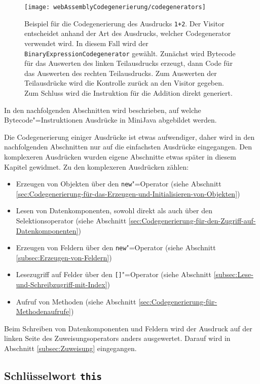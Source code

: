 \begin{figure}
    \centering
    \texttt{[image: webAssemblyCodegenerierung/codegenerators]}
    \caption{Beispiel für die Codegenerierung des Ausdrucks \lstinline{1+2}. Der Visitor entscheidet anhand der Art des Ausdrucks, welcher Codegenerator verwendet wird. In diesem Fall wird der \lstinline{BinaryExpressionCodegenerator} gewählt. Zunächst wird Bytecode für das Auswerten des linken Teilausdrucks erzeugt, dann Code für das Auswerten des rechten Teilausdrucks. Zum Auswerten der Teilausdrücke wird die Kontrolle zurück an den Visitor gegeben. Zum Schluss wird die Instruktion für die Addition direkt generiert.}
    \label{fig:codegenerators}
\end{figure}

In den nachfolgenden Abschnitten wird beschrieben, auf welche Bytecode"=Instruktionen Ausdrücke in MiniJava abgebildet werden.

\pagebreak
Die Codegenerierung einiger Ausdrücke ist etwas aufwendiger, daher wird in den nachfolgenden Abschnitten nur auf die einfachsten Ausdrücke eingegangen. Den komplexeren Ausdrücken wurden eigene Abschnitte etwas später in diesem Kapitel gewidmet. Zu den komplexeren Ausdrücken zählen: 
\begin{itemize}
    \item Erzeugen von Objekten über den \lstinline{new}"=Operator (siehe Abschnitt \ref{sec:Codegenerierung-für-das-Erzeugen-und-Initialisieren-von-Objekten})
    \item Lesen von Datenkomponenten, sowohl direkt als auch über den Selektionsoperator (siehe Abschnitt \ref{sec:Codegenerierung-für-den-Zugriff-auf-Datenkomponenten})
    \item Erzeugen von Feldern über den \lstinline{new}"=Operator (siehe Abschnitt \ref{subsec:Erzeugen-von-Feldern})
    \item Lesezugriff auf Felder über den \lstinline{[]}"=Operator (siehe Abschnitt \ref{subsec:Lese-und-Schreibzugriff-mit-Index})
    \item Aufruf von Methoden (siehe Abschnitt \ref{sec:Codegenerierung-für-Methodenaufrufe})
\end{itemize}

Beim Schreiben von Datenkomponenten und Feldern wird der Ausdruck auf der linken Seite des Zuweisungsoperators anders ausgewertet. Darauf wird in Abschnitt \ref{subsec:Zuweisung} eingegangen.

\subsection{Schlüsselwort \lstinline{this}}

